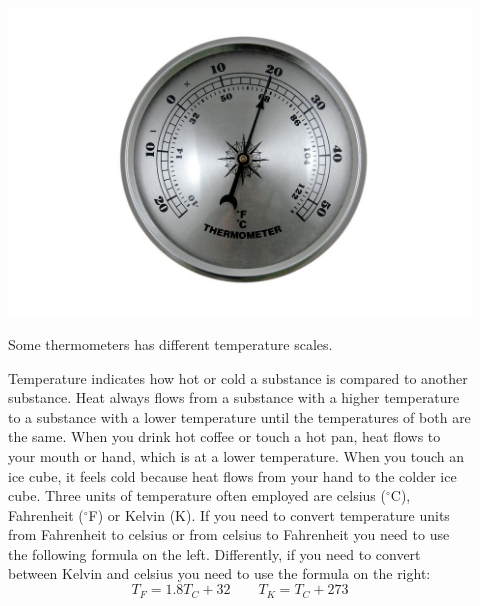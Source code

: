 \documentclass[main.tex]{subfiles}
\begin{document}
\begin{description}
\item[]
\begin{marginfigure}[-2cm]
      \includegraphics{chapter2/figure1-3}
      \caption{Some thermometers has different temperature scales.}
      \label{fig:marginfig}
   \end{marginfigure}
Temperature indicates how hot or cold a substance is compared to another substance. Heat always flows from a substance with a higher temperature to a substance with a lower temperature until the temperatures of both are the same. When you drink hot coffee or touch a hot pan, heat flows to your mouth or hand, which is at a lower temperature. When you touch an ice cube, it feels cold because heat flows from your hand to the colder ice cube. Three units of temperature often employed are celsius ($^{\circ}$C), Fahrenheit ($^{\circ}$F) or Kelvin (K). If you need to convert temperature units from Fahrenheit  to celsius or from celsius to Fahrenheit you need to use the following formula on the left. Differently, if you need to convert between Kelvin and celsius you need to use the formula on the right:
\begin{equation}
\boxed{   T_F = 1.8T_C  + 32   }
\qquad
\boxed{     T_K = T_C  + 273   }
\label{formula2:2}
\end{equation}


\end{description}
\end{document}

